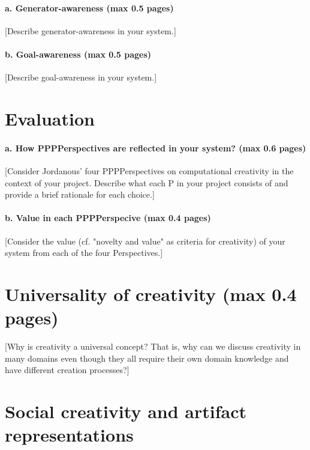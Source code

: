 \documentclass[english]{tktltiki}
\begin{document}
    \paragraph{a. Generator-awareness (max 0.5 pages)}
    [Describe generator-awareness in your system.]
    
    \paragraph{b. Goal-awareness (max 0.5 pages)} 
    [Describe goal-awareness in your system.]
    
    
    
    \pagebreak
    \section{Evaluation}
    
    \paragraph{a. How PPPPerspectives are reflected in your system? (max 0.6 pages)}
    
    [Consider Jordanous' four PPPPerspectives on computational creativity in the context of your project. Describe what each P in your project consists of and provide a brief rationale for each choice.]
    
    \paragraph{b. Value in each PPPPerspecive (max 0.4 pages) }
    
    [Consider the value (cf. "novelty and value" as criteria for creativity) of your system from each of the four Perspectives.]
    
    \pagebreak
    \section{Universality of creativity (max 0.4 pages)}
    
    [Why is creativity a universal concept? That is, why can we discuss creativity in many domains even though they all require their own domain knowledge and have different creation processes?]
    
    \section{Social creativity and artifact representations}
    
\end{document}
